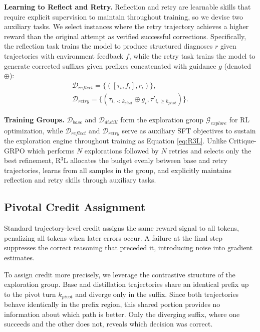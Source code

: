 \documentclass{article} %
\theoremstyle{definition}
\theoremstyle{remark}
\begin{document}
\textbf{Learning to Reflect and Retry.} Reflection and retry are learnable skills that require explicit supervision to maintain throughout training, so we devise two auxiliary tasks. We select instances where the retry trajectory achieves a higher reward than the original attempt as verified successful corrections. Specifically, the reflection task trains the model to produce structured diagnoses $r$ given trajectories with environment feedback $f$, while the retry task trains the model to generate corrected suffixes given prefixes concatenated with guidance $g$ (denoted $\oplus$):
\begin{equation}
\begin{gathered}
    \mathcal{D}_{reflect} = \{([\tau_i, f_i], r_i)\}, \\
    \mathcal{D}_{retry} = \{(\tau_{i,<k_{pivot}} \oplus g_i, \tau'_{i,\geq k_{pivot}})\}.
\end{gathered}
\end{equation}

\textbf{Training Groups.} $\mathcal{D}_{base}$ and $\mathcal{D}_{distill}$ form the exploration group $\mathcal{G}_{explore}$ for RL optimization, while $\mathcal{D}_{reflect}$ and $\mathcal{D}_{retry}$ serve as auxiliary SFT objectives to sustain the exploration engine throughout training as Equation \ref{eq:R3L}. Unlike Critique-GRPO which performs $N$ explorations followed by $N$ retries and selects only the best refinement, R$^3$L allocates the budget evenly between base and retry trajectories, learns from all samples in the group, and explicitly maintains reflection and retry skills through auxiliary tasks.

\subsection{Pivotal Credit Assignment}
Standard trajectory-level credit assigns the same reward signal to all tokens, penalizing all tokens when later errors occur. A failure at the final step suppresses the correct reasoning that preceded it, introducing noise into gradient estimates.

To assign credit more precisely, we leverage the contrastive structure of the exploration group. Base and distillation trajectories share an identical prefix up to the pivot turn $k_{pivot}$ and diverge only in the suffix. Since both trajectories behave identically in the prefix region, this shared portion provides no information about which path is better. Only the diverging suffix, where one succeeds and the other does not, reveals which decision was correct.
\end{document}

